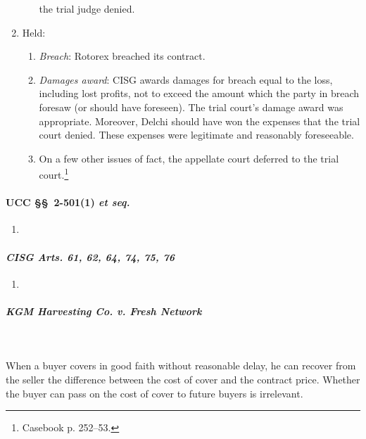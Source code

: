 \begin{enumerate}
\begin{enumerate}
        the trial judge denied.
    \end{enumerate}
    \item Held:
    \begin{enumerate}
        \item \emph{Breach}: Rotorex breached its contract.
        \item \emph{Damages award}: CISG awards damages for breach equal to 
        the loss, including lost profits, not to exceed the amount which the 
        party in breach foresaw (or should have foreseen). The trial court's 
        damage award was appropriate. Moreover, Delchi should have won the 
        expenses that the trial court denied. These expenses were legitimate 
        and reasonably foreseeable.
        \item On a few other issues of fact, the appellate court deferred to 
        the trial court.\footnote{Casebook p. 252--53.}
    \end{enumerate}
\end{enumerate}

\paragraph{UCC \S\S\ 2-501(1) \emph{et seq.}}

\begin{enumerate}
    \item %
\end{enumerate}

\paragraph{\emph{CISG Arts. 61, 62, 64, 74, 75, 76}}

\begin{enumerate}
    \item %
\end{enumerate}

\paragraph{\emph{KGM Harvesting Co. v. Fresh Network}}
~\\\\
When a buyer covers in good faith without reasonable delay, he can recover 
from the seller the difference between the cost of cover and the contract 
price. Whether the buyer can pass on the cost of cover to future buyers is 
irrelevant.

